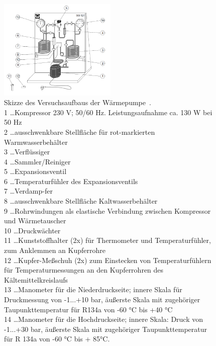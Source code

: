\documentclass[12pt,english,ngerman]{scrartcl}
\begin{document}
\begin{figure}[H]
	\begin{center}
		\includegraphics[width =0.5\textwidth]{./figures/warmepumpe_skizze.PNG}
	\end{center}
	\caption[Skizze des Versuchsaufbaus der Wärmepumpe]{Skizze des Versuchsaufbaus der
		Wärmepumpe~\cite[text]{hohenau_warmepumpe_2014}.                          \\
		1 \dots Kompressor 230 V; 50/60 Hz. Leistungsaufnahme ca. 130 W bei 50 Hz \\
		2 \dots ausschwenkbare Stellfläche für rot-markierten Warmwasserbehälter  \\
		3 \dots Verflüssiger                                                      \\
		4 \dots Sammler/Reiniger                                                  \\
		5 \dots Expansionsventil                                                  \\
		6 \dots Temperaturfühler des Expansionsventils                            \\
		7 \dots Verdamp-fer                                                       \\
		8 \dots ausschwenkbare Stellfläche Kaltwasserbehälter                     \\
		9 \dots Rohrwindungen als elastische Verbindung zwischen Kompressor und
		Wärmetauscher                                                             \\
		10 \dots Druckwächter                                                     \\
		11 \dots Kunststoffhalter (2x) für Thermometer und Temperaturfühler, zum
		Anklemmen an Kupferrohre                                                  \\
		12 \dots Kupfer-Meßschuh (2x) zum Einstecken von Temperaturfühlern für
		Temperaturmessungen an den Kupferrohren des Kältemittelkreislaufs         \\
		13 \dots Manometer für die Niederdruckseite; innere Skala für Druckmessung von
		-1...+10 bar, äußerste Skala mit zugehöriger Taupunkttemperatur für R134a von
		-60 °C bis +40 °C                                                         \\
		14 \dots Manometer für die Hochdruckseite; innere Skala: Druck von -1...+30
		bar, äußerste Skala mit zugehöriger Taupunkttemperatur für R 134a von -60 °C
		bis + 85°C.
	}\label{fig:skizze_warmepumpe}
\end{figure}
\end{document}
